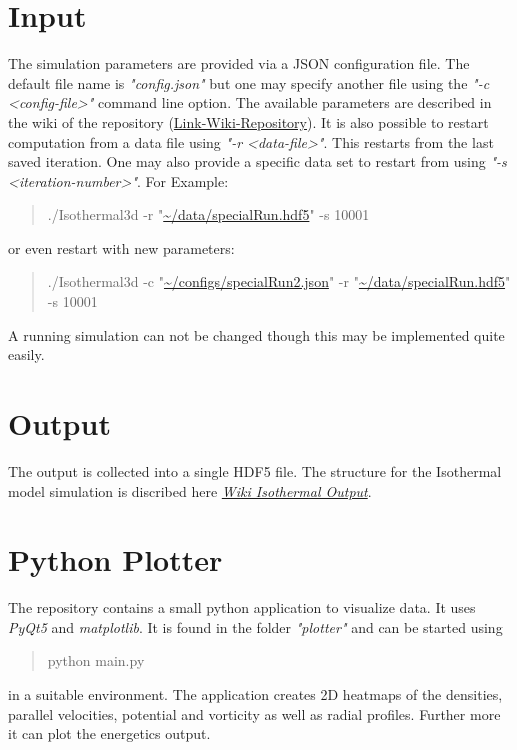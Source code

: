 \documentclass[master.tex]{subfiles}
\begin{document}
\section{Input}
The simulation parameters are provided via a \ac{JSON} configuration file. The default file name is \textit{"config.json"} but one may specify another file using the \textit{"-c <config-file>"} command line option. The available parameters are described in the wiki of the repository (\href{https://git.uibk.ac.at/csat8630/t3g-cmake/wikis/parameters}{Link-Wiki-Repository}). It is also possible to restart computation from a data file using \textit{"-r <data-file>"}. This restarts from the last saved iteration. One may also provide a specific data set to restart from using \textit{"-s <iteration-number>"}. For Example:
\begin{quote}
    \small
./Isothermal3d -r "\url{~/data/specialRun.hdf5}" -s 10001
\end{quote}
or even restart with new parameters:
\begin{quote}
\small
      ./Isothermal3d -c "\url{~/configs/specialRun2.json}" -r "\url{~/data/specialRun.hdf5}" -s 10001  
\end{quote}
A running simulation can not be changed though this may be implemented quite easily.

\section{Output}
\label{sec:output}
The output is collected into a single \ac{HDF5} file. The structure for the Isothermal model simulation is discribed here \textit{\href{https://git.uibk.ac.at/csat8630/t3g-cmake/wikis/Isothermal/Output}{Wiki Isothermal Output}}.

\section{Python Plotter}
The repository contains a small python application to visualize data. It uses \textit{PyQt5} and \textit{matplotlib}. It is found in the folder \textit{"plotter"} and can be started using
\begin{quote}
    python main.py
\end{quote}
in a suitable environment. The application creates 2D heatmaps of the densities, parallel velocities, potential and vorticity as well as radial profiles. Further more it can plot the energetics output.
\end{document}
